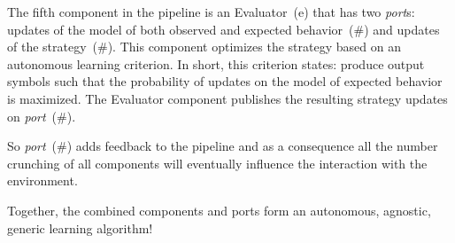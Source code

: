 \documentclass[12pt,a4paper]{artikel3}
\def\Name#1{{\sffamily #1}}
\def\NR#1{(\#\relax #1)}
\def\Port/{\emph{port\/}}
\def\PortNR#1{\Port/~\NR{#1}}
\def\Evaluator/{\Name{Evaluator}}
\begin{document}
The fifth component in the pipeline is an \Evaluator/~(e) that has two \Port/s: updates of the model of both observed and expected behavior~\NR{4} and updates of the strategy~\NR{5}. This component optimizes the strategy based on an autonomous learning criterion. In short, this criterion states: produce output symbols such that the probability of updates on the model of expected behavior is maximized. The \Evaluator/ component publishes the resulting strategy updates on \PortNR{5}.

So \PortNR{5} adds feedback to the pipeline and as a consequence all the number crunching of all components will eventually influence the interaction with the environment.

Together, the combined components and ports form an autonomous, agnostic, generic learning algorithm!
\end{document}
